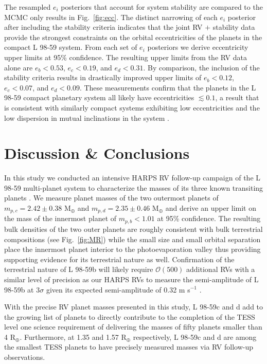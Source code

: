 \documentclass[longauth]{aa}
\newcommand{\mps}{m s$^{-1}$}
\begin{document}
The resampled $e_i$ posteriors that account for system stability are compared to the MCMC only results in Fig.~\ref{fig:ecc}. The distinct narrowing of each $e_i$ posterior after including the stability criteria indicates that the joint RV $+$ stability data provide the strongest constraints on the orbital eccentricities of the planets in the compact L 98-59 system. From each set of $e_i$ posteriors we derive eccentricity upper limits at 95\% confidence. The resulting upper limits from the RV data alone are $e_b < 0.53$, $e_c<0.19$, and $e_d < 0.31$. By comparison, the inclusion of the stability criteria results in drastically improved upper limits of $e_b < 0.12$, $e_c<0.07$, and $e_d < 0.09$. These measurements confirm that the planets in the L 98-59 compact planetary system all likely have eccentricities $\lesssim 0.1$, a result that is consistent with similarly compact systems exhibiting low eccentricities \citep{hadden14,vaneylen15} and the low dispersion in mutual inclinations in the system .

\section{Discussion \& Conclusions}
\label{sec:conclusion}
In this study we conducted an intensive HARPS RV follow-up campaign of the L 98-59 multi-planet system to characterize the masses of its three known transiting planets . We measure planet masses of the two outermost planets of $m_{p,c}=2.42\pm 0.38$ M$_{\oplus}$ and $m_{p,d}=2.35\pm 0.46$ M$_{\oplus}$ and derive an upper limit on the mass of the innermost planet of $m_{p,b}<1.01$ at 95\% confidence. The resulting bulk densities of the two outer planets are roughly consistent with bulk terrestrial compositions (see Fig.~\ref{fig:MR}) while the small size and small orbital separation place the innermost planet interior to the photoevaporation valley \citep{owen13,jin14,lopez14,chen16,lopez16,owen17} thus providing supporting evidence for its terrestrial nature as well. Confirmation of the terrestrial nature of L 98-59b will likely require $\mathcal{O}(500)$ additional RVs with a similar level of precision as our HARPS RVs to measure the semi-amplitude of L 98-59b at $3\sigma$ \citep{cloutier18b} given its expected semi-amplitude of 0.32 \mps{} \citep{chen17}. 

With the precise RV planet masses presented in this study, L 98-59c and d add to the growing list of planets to directly contribute to the completion of the TESS level one science requirement of delivering the masses of fifty planets smaller than 4 R$_{\oplus}$. Furthermore, at 1.35 and 1.57 R$_{\oplus}$ respectively, L 98-59c and d are among the smallest TESS planets to have precisely measured masses via RV follow-up observations.
\end{document}

